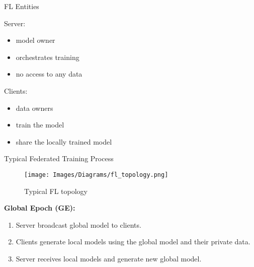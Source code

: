 
\begin{frame}{FL Entities}
	\begin{minipage}{0.5\textwidth}
    	Server:
    	\begin{itemize}
    	    \item model owner
    	    \item orchestrates training
    	    \item no access to any data
    	\end{itemize}
	\end{minipage}%
	\begin{minipage}{0.5\textwidth}
    	Clients:
    	\begin{itemize}
    	    \item data owners
    	    \item train the model
    	    \item share the locally trained model
    	\end{itemize}
	\end{minipage}%
\end{frame}

\begin{frame}{Typical Federated Training Process}
	\begin{minipage}{0.4\textwidth}
        \begin{figure}[H]
            \centering
    		\texttt{[image: Images/Diagrams/fl\_topology.png]}\\
    		\caption*{Typical FL topology}
		\end{figure}
	\end{minipage}%
	\begin{minipage}{0.6\textwidth}
		\hspace{0.75cm}\textbf{Global Epoch (GE):}
		\begin{enumerate}
		    \item Server broadcast global model to clients.
		    \item Clients generate local models using the global model and their private data.
		    \item Server receives local models and generate new global model.
		\end{enumerate}
	\end{minipage}%
\end{frame}

